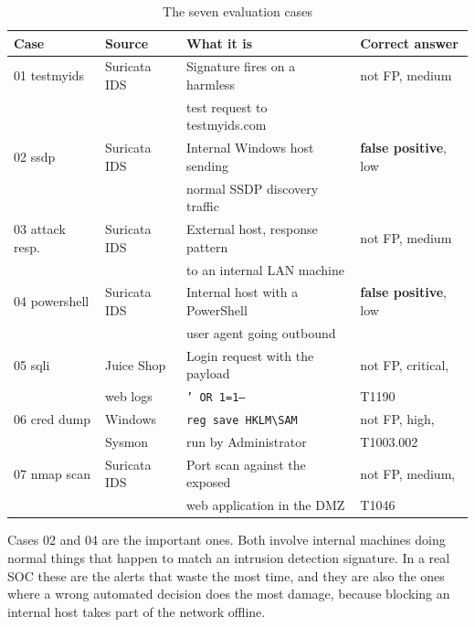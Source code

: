 \documentclass[11pt,a4paper]{article}
\newcommand{\best}[1]{\textbf{#1}}
\begin{document}
\begin{table}[h]
\centering
\small
\caption{The seven evaluation cases}
\begin{tabular}{@{}llll@{}}
\toprule
\textbf{Case} & \textbf{Source} & \textbf{What it is} & \textbf{Correct answer} \\
\midrule
01 testmyids     & Suricata IDS  & Signature fires on a harmless    & not FP, medium \\
                 &               & test request to testmyids.com    &                \\
02 ssdp          & Suricata IDS  & Internal Windows host sending    & \best{false positive}, low \\
                 &               & normal SSDP discovery traffic    &                \\
03 attack resp.  & Suricata IDS  & External host, response pattern  & not FP, medium \\
                 &               & to an internal LAN machine       &                \\
04 powershell    & Suricata IDS  & Internal host with a PowerShell  & \best{false positive}, low \\
                 &               & user agent going outbound        &                \\
05 sqli          & Juice Shop    & Login request with the payload   & not FP, critical, \\
                 & web logs      & \texttt{' OR 1=1--}              & T1190 \\
06 cred dump     & Windows       & \texttt{reg save HKLM\textbackslash SAM}
                                                                    & not FP, high, \\
                 & Sysmon        & run by Administrator             & T1003.002 \\
07 nmap scan     & Suricata IDS  & Port scan against the exposed    & not FP, medium, \\
                 &               & web application in the DMZ       & T1046 \\
\bottomrule
\end{tabular}
\end{table}

Cases 02 and 04 are the important ones. Both involve internal machines doing normal
things that happen to match an intrusion detection signature. In a real SOC these
are the alerts that waste the most time, and they are also the ones where a wrong
automated decision does the most damage, because blocking an internal host takes
part of the network offline.
\end{document}
